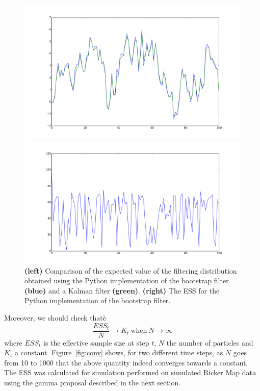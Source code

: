 \documentclass{article}
\begin{document}
\begin{figure}[htb]
	\centering
	\begin{minipage}{.45\textwidth}
		\centering
		\includegraphics[width=0.97\linewidth]{bootstrap-filter/verif_filter.pdf}
	\end{minipage}
	\begin{minipage}{.45\textwidth}
		\centering
		\includegraphics[width=0.97\linewidth]{bootstrap-filter/ESS_filter.pdf}
	\end{minipage}
	\caption{\textbf{(left)} Comparison of the expected value of the filtering distribution obtained using the Python implementation of the bootstrap filter \textbf{(blue)} and a Kalman filter \textbf{(green)}. \textbf{(right)} The ESS for the Python implementation of the bootstrap filter. }
	\label{fig:bootstrap}
\end{figure}

Moreover, we should check thatè
\begin{equation*}
	\frac{ESS_t}{N} \rightarrow K_t \ \text{when} \ N \rightarrow \infty
\end{equation*}
where $ESS_t$ is the effective sample size at step $t$, $N$ the number of particles and $K_t$ a constant. Figure~\ref{fig:conv} shows, for two different time steps, as $N$ goes from 10 to 1000 that the above quantity indeed converges towards a constant. The ESS was calculated for simulation performed on simulated Ricker Map data using the gamma proposal described in the next section.
\end{document}

